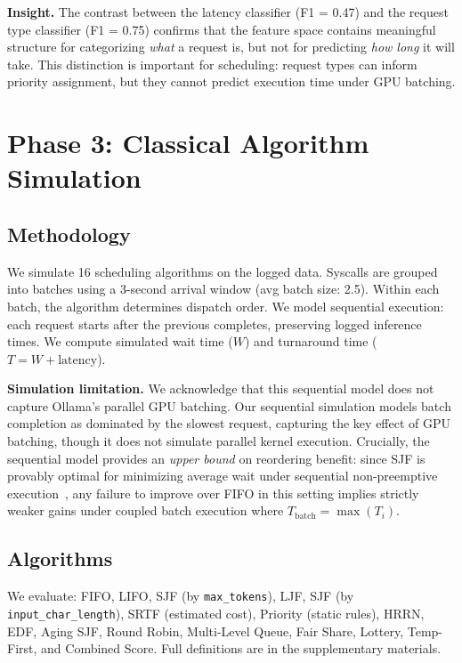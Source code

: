 \documentclass[conference]{IEEEtran}
\begin{document}
\textbf{Insight.} The contrast between the latency classifier (F1 = 0.47) and the request type classifier (F1 = 0.75) confirms that the feature space contains meaningful structure for categorizing \textit{what} a request is, but not for predicting \textit{how long} it will take. This distinction is important for scheduling: request types can inform priority assignment, but they cannot predict execution time under GPU batching.

\section{Phase 3: Classical Algorithm Simulation}

\subsection{Methodology}
We simulate 16 scheduling algorithms on the logged data. Syscalls are grouped into batches using a 3-second arrival window (avg batch size: 2.5). Within each batch, the algorithm determines dispatch order. We model sequential execution: each request starts after the previous completes, preserving logged inference times. We compute simulated wait time ($W$) and turnaround time ($T = W + \text{latency}$).

\textbf{Simulation limitation.} We acknowledge that this sequential model does not capture Ollama's parallel GPU batching. Our sequential simulation models batch completion as dominated by the slowest request, capturing the key effect of GPU batching, though it does not simulate parallel kernel execution. Crucially, the sequential model provides an \textit{upper bound} on reordering benefit: since SJF is provably optimal for minimizing average wait under sequential non-preemptive execution~\cite{silberschatz2018os}, any failure to improve over FIFO in this setting implies strictly weaker gains under coupled batch execution where $T_{\text{batch}} = \max(T_i)$.

\subsection{Algorithms}
We evaluate: FIFO, LIFO, SJF (by \texttt{max\_tokens}), LJF, SJF (by \texttt{input\_char\_length}), SRTF (estimated cost), Priority (static rules), HRRN, EDF, Aging SJF, Round Robin, Multi-Level Queue, Fair Share, Lottery, Temp-First, and Combined Score. Full definitions are in the supplementary materials.
\end{document}
